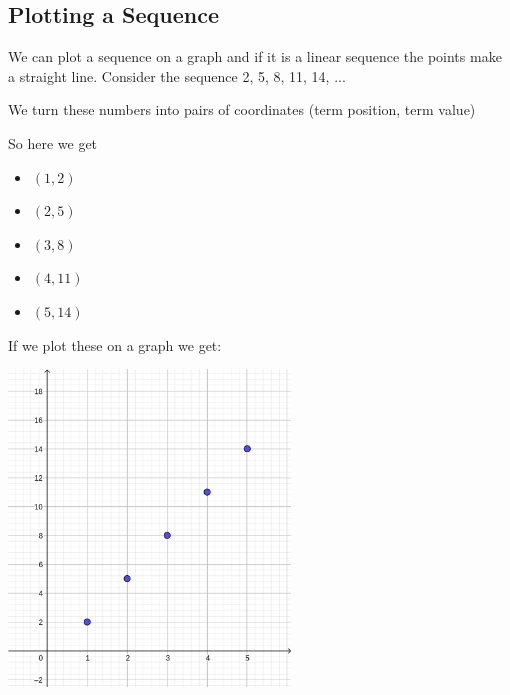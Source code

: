 \subsection{Plotting a Sequence}
We can plot a sequence on a graph and if it is a linear sequence the points make a straight line.  Consider the sequence 2, 5, 8, 11, 14, ...

\bigskip

We turn these numbers into pairs of coordinates (term position, term value)

\bigskip

So here we get

\begin{itemize}
	\item $(1,2)$
	\item $(2,5)$
	\item $(3,8)$
	\item $(4,11)$
	\item $(5,14)$
\end{itemize}

If we plot these on a graph we get:

\begin{center}
	\includegraphics[height=8.4cm,keepaspectratio]{./Images/Algebra/seqPlot}
\end{center}

